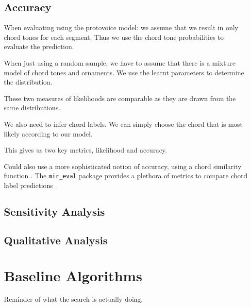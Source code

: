 \documentclass[12pt,a4paper,twoside,openright]{report} \usepackage[pdfborder={0 0 0}]{hyperref}    %
\theoremstyle{definition} \newtheorem{definition}{Definition}[section]
\begin{document}
  \subsection{Accuracy} When evaluating using the protovoice model: we assume that we result in only chord tones for
  each segment. Thus we use the chord tone probabilities to evaluate the prediction. \par When just using a random
  sample, we have to assume that there is a mixture model of chord tones and ornaments. We use the learnt parameters to
  determine the distribution. \par These two measures of likelihoods are comparable as they are drawn from the same
  distributions. \par We also need to infer chord labels. We can simply choose the chord that is most likely according
  to our model. \par This gives us two key metrics, likelihood and accuracy. \par Could also use a more sophisticated
  notion of accuracy, using a chord similarity function \cite{humphreyFourTimelyInsights2015}. The {\texttt {mir\_eval}}
  package provides a plethora of metrics to compare chord label predictions \cite{raffelMirEvalTransparent2014}. 

  \subsection{Sensitivity Analysis}

  \subsection{Qualitative Analysis}

  \section{Baseline Algorithms} Reminder of what the search is actually doing. 
\end{document}
